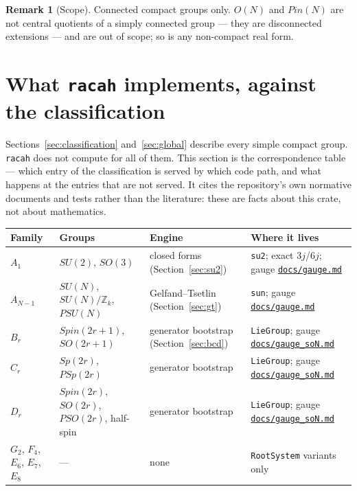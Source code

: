 \documentclass[11pt,a4paper]{article}
\theoremstyle{plain}
\theoremstyle{definition}
\newtheorem{remark}[theorem]{Remark}
\newcommand{\ZZ}{\mathbb{Z}}
\newcommand{\code}[1]{\texttt{#1}}
\newcommand{\gaugemd}{\href{https://github.com/Ryo-wtnb11/fusion-symbols/blob/main/docs/gauge.md}{\code{docs/gauge.md}}}
\newcommand{\gaugeson}{\href{https://github.com/Ryo-wtnb11/fusion-symbols/blob/main/docs/gauge_soN.md}{\code{docs/gauge\_soN.md}}}
\begin{document}
\begin{remark}[Scope]
Connected compact groups only. $O(N)$ and $Pin(N)$ are not central quotients of
a simply connected group --- they are disconnected extensions --- and are out
of scope; so is any non-compact real form.
\end{remark}

\section{What \code{racah} implements, against the classification}
\label{sec:racah}

Sections~\ref{sec:classification} and~\ref{sec:global} describe every simple
compact group. \code{racah} does not compute for all of them. This section is
the correspondence table --- which entry of the classification is served by
which code path, and what happens at the entries that are not served. It cites
the repository's own normative documents and tests rather than the literature:
these are facts about this crate, not about mathematics.

\begin{center}
\small
\begin{tabular}{@{}p{2.1cm}p{2.5cm}p{3.1cm}p{5.4cm}@{}}
\toprule
Family & Groups & Engine & Where it lives \\
\midrule
$A_1$ & $SU(2)$, $SO(3)$ &
  closed forms (Section~\ref{sec:su2}) &
  \code{su2}; exact $3j$/$6j$; gauge \gaugemd{} \\
$A_{N-1}$ & $SU(N)$, $SU(N)/\ZZ_k$, $PSU(N)$ &
  Gelfand--Tsetlin (Section~\ref{sec:gt}) &
  \code{sun}; gauge \gaugemd{} \\
$B_r$ & $Spin(2r+1)$, $SO(2r+1)$ &
  generator bootstrap (Section~\ref{sec:bcd}) &
  \code{LieGroup}; gauge \gaugeson{} \\
$C_r$ & $Sp(2r)$, $PSp(2r)$ &
  generator bootstrap &
  \code{LieGroup}; gauge \gaugeson{} \\
$D_r$ & $Spin(2r)$, $SO(2r)$, $PSO(2r)$, half-spin &
  generator bootstrap &
  \code{LieGroup}; gauge \gaugeson{} \\
$G_2$, $F_4$, $E_6$, $E_7$, $E_8$ & --- &
  none &
  \code{RootSystem} variants only \\
\bottomrule
\end{tabular}
\end{center}
\end{document}
